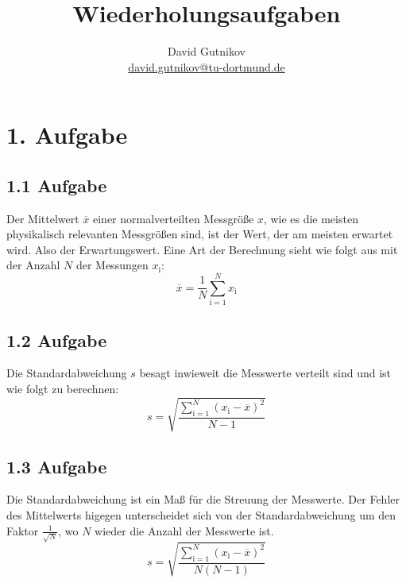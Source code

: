 \documentclass[titlepage = firstcover]{scrartcl}
\title{Wiederholungsaufgaben}
\author{
    David Gutnikov\\
    \href{mailto:david.gutnikov@tu-dortmund.de}{david.gutnikov@tu-dortmund.de}
}
\begin{document}
    \maketitle
    \newpage    
    \newpage

    \section*{1. Aufgabe}
        \subsection*{1.1 Aufgabe}
            Der Mittelwert $\overline{x}$ einer normalverteilten Messgröße $x$, wie es die meisten physikalisch relevanten Messgrößen sind, ist der Wert, der am meisten erwartet wird. Also der Erwartungswert. Eine Art der Berechnung sieht wie folgt aus mit der Anzahl $N$ der Messungen $x_\text{i}$:
            \begin{equation*}
                \overline{x} = \frac{1}{N} \sum_{\text{i}=1}^{N} x_\text{i}
            \end{equation*}

        \subsection*{1.2 Aufgabe}
            Die Standardabweichung $s$ besagt inwieweit die Messwerte verteilt sind und ist wie folgt zu berechnen:
            \begin{equation*}
                s = \sqrt{\frac{\sum_{\text{i}=1}^{N} (x_\text{i} - \overline{x})^2}{N - 1}}
            \end{equation*}
        
        \subsection*{1.3 Aufgabe}
            Die Standardabweichung ist ein Maß für die Streuung der Messwerte. Der Fehler des Mittelwerts higegen unterscheidet sich von der Standardabweichung um den Faktor $\frac{1}{\sqrt{N}}$, wo $N$ wieder die Anzahl der Messwerte ist.
            \begin{equation*}
                s = \sqrt{\frac{\sum_{\text{i}=1}^{N} (x_\text{i} - \overline{x})^2}{N(N - 1)}}
            \end{equation*}
\end{document}
